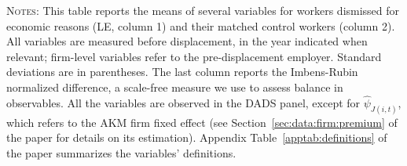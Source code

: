 \documentclass[11pt]{article}
\begin{document}
\begin{table}[h!]
\centering
\caption{Descriptive statistics before displacement: displaced workers (LE) and matched controls (Table~\ref{tab:desc:AllLE} of the paper, formerly Appendix Table A4)}
\label{tab:R3_desc}
{\footnotesize
}

\par\medskip
\begin{minipage}{0.95\linewidth}\footnotesize\justifying\textsc{Notes}: This table reports the means of several variables for workers dismissed for economic reasons (LE, column 1) and their matched control workers (column 2). All variables are measured before displacement, in the year indicated when relevant; firm-level variables refer to the pre-displacement employer. Standard deviations are in parentheses. The last column reports the Imbens-Rubin normalized difference, a scale-free measure we use to assess balance in observables. All the variables are observed in the DADS panel, except for $\widehat{\psi}_{J(i, t)}$, which refers to the AKM firm fixed effect (see Section~\ref{sec:data:firm:premium} of the paper for details on its estimation). Appendix Table~\ref{apptab:definitions} of the paper summarizes the variables' definitions.\end{minipage}
\end{table}
\end{document}
